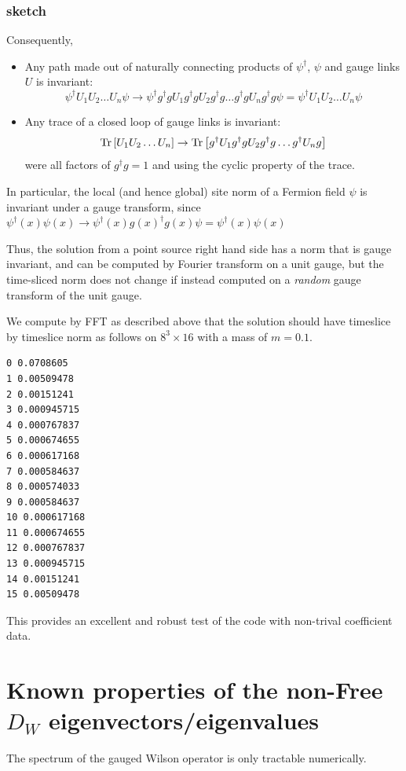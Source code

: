 \documentclass[letter,10pt]{report}
\begin{document}
\subsubsection{sketch}
Consequently,
\begin{itemize}
\item Any path made out of naturally connecting products of $\psi^\dagger$, $\psi$ and gauge links $U$ is invariant:
$$\psi^\dagger U_1 U_2 \ldots U_n \psi \to \psi^\dagger g^\dagger g U_1 g^\dagger g U_2  g^\dagger g \ldots   g^\dagger g U_n g^\dagger g \psi =
 \psi^\dagger U_1 U_2 \ldots U_n \psi$$
\item Any trace of a closed loop of gauge links is invariant:
  $$
  {\rm Tr}\left[ U_1 U_2 \ldots U_n \right] \to   {\rm Tr}\left[g^\dagger U_1 g^\dagger g U_2 g^\dagger g \ldots g^\dagger U_n g \right]
  $$
were all factors of $g^\dagger g = 1$ and using the cyclic property of the trace.
\end{itemize}

In particular, the local (and hence global) site norm of a Fermion field $\psi$ is invariant under a gauge transform,
since $\psi^\dagger(x) \psi(x) \to \psi^\dagger(x) g(x)^\dagger g(x) \psi = \psi^\dagger(x) \psi(x)$

Thus, the solution from a point source right hand side has a norm that is gauge invariant, and can be computed by Fourier
transform on a unit gauge, but the time-sliced norm does not change if instead computed on a \emph{random} gauge transform
of the unit gauge.

We compute by FFT as described above that the solution should have timeslice by timeslice norm as follows on $8^3\times 16$ with a
mass of $m=0.1$.

\begin{verbatim}
0 0.0708605
1 0.00509478
2 0.00151241
3 0.000945715
4 0.000767837
5 0.000674655
6 0.000617168
7 0.000584637
8 0.000574033
9 0.000584637
10 0.000617168
11 0.000674655
12 0.000767837
13 0.000945715
14 0.00151241
15 0.00509478
\end{verbatim}

This provides an excellent and robust test of the code with non-trival coefficient data.


\section{Known properties of the non-Free $D_W$ eigenvectors/eigenvalues}

The spectrum of the gauged Wilson operator is only tractable numerically.
\end{document}

